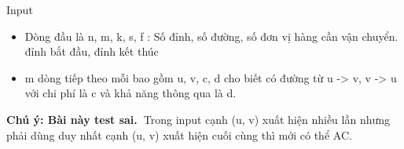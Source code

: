 Input
\begin{itemize}
	\item Dòng đầu là n, m, k, s, f : Số đỉnh, số đường, số đơn vị hàng cần vận chuyển. đỉnh bắt đầu, đỉnh kết thúc
	\item m dòng tiếp theo mỗi bao gồm u, v, c, d cho biết có đường từ u -> v, v -> u với chi phí là c và khả năng thông qua là d.
\end{itemize}

\textbf{Chú ý: Bài này test sai. }Trong input cạnh (u, v) xuất hiện nhiều lần nhưng phải dùng duy nhất cạnh (u, v) xuất hiện cuối cùng thì mới có thể AC.